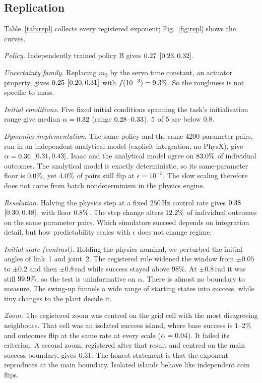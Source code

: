 \documentclass[conference]{IEEEtran}
\begin{document}
\subsection{Replication}
Table~\ref{tab:repl} collects every registered exponent; Fig.~\ref{fig:repl} shows the curves.

\emph{Policy.} Independently trained policy B gives $0.27$ $[0.23,0.32]$.

\emph{Uncertainty family.} Replacing $m_3$ by the servo time constant, an actuator property, gives
$0.25$ $[0.20,0.31]$ with $f(10^{-3})=9.3\%$. So the roughness is not specific to mass.

\emph{Initial conditions.} Five fixed initial conditions spanning the task's initialisation range give
median $\alpha=0.32$ (range $0.28$--$0.33$). $5$ of $5$ are below $0.8$.

\emph{Dynamics implementation.} The same policy and the same $4200$ parameter pairs, run in an independent
analytical model (explicit integration, no PhysX), give $\alpha=0.36$ $[0.31,0.43]$.
Isaac and the analytical model agree on $83.0\%$ of individual outcomes. The analytical model is
exactly deterministic, so its same-parameter floor is $0.0\%$, yet $4.0\%$ of pairs
still flip at $\epsilon=10^{-3}$. The slow scaling therefore does not come from batch nondeterminism in
the physics engine.

\emph{Resolution.} Halving the physics step at a fixed $250$\,Hz control rate gives $0.38$
$[0.30,0.48]$, with floor $0.8\%$. The step change alters $12.2\%$ of
individual outcomes on the same parameter pairs. Which simulators succeed depends on integration detail,
but how predictability scales with $\epsilon$ does not change regime.

\emph{Initial state (contrast).} Holding the physics nominal, we perturbed the initial angles of link~1
and joint~2. The registered rule widened the window from $\pm0.05$ to $\pm0.2$ and then $\pm0.8$\,rad while
success stayed above $98\%$. At $\pm0.8$\,rad it was still $99.9\%$, so the test is uninformative on
$\alpha$. There is almost no boundary to measure. The swing-up funnels a wide range of starting states
into success, while tiny changes to the plant decide it.

\emph{Zoom.} The registered zoom was centred on the grid cell with the most disagreeing neighbours. That cell
was an isolated success island, where base success is $1$--$2\%$ and outcomes flip at the same rate at
every scale ($\alpha=0.04$). It failed its criterion. A second zoom, registered after that result
and centred on the main success boundary, gives $0.31$. The honest statement is that the
exponent reproduces at the main boundary. Isolated islands behave like independent coin flips.
\end{document}
